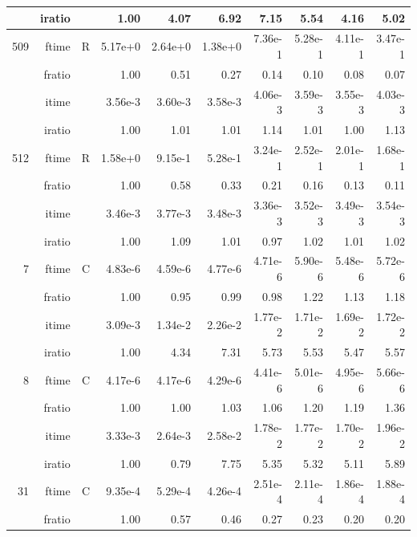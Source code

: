 \documentclass[a4paper]{article}
\begin{document}
\begin{table}[htbp]
\begin{center}
\begin{small}
\begin{tabular}{|r|r|r|r|r|r|r|r|r|r|}
     & iratio & &       1.00 &   4.07 &   6.92 &   7.15 &   5.54 &   4.16 &   5.02     \\ \hline 
  509  & ftime & R  &   5.17e+0 &   2.64e+0 &   1.38e+0 &   7.36e-1 &   5.28e-1 &   4.11e-1 &   3.47e-1   \\ 
      & fratio & &      1.00 &   0.51 &   0.27 &   0.14 &   0.10 &   0.08 &   0.07       \\ 
     & itime & &        3.56e-3 &   3.60e-3 &   3.58e-3 &   4.06e-3 &   3.59e-3 &   3.55e-3 &   4.03e-3      \\ 
     & iratio & &       1.00 &   1.01 &   1.01 &   1.14 &   1.01 &   1.00 &   1.13        \\ \hline 
  512  & ftime & R  &   1.58e+0 &   9.15e-1 &   5.28e-1 &   3.24e-1 &   2.52e-1 &   2.01e-1 &   1.68e-1    \\ 
      & fratio & &      1.00 &   0.58 &   0.33 &   0.21 &   0.16 &   0.13 &   0.11    \\ 
     & itime & &        3.46e-3 &   3.77e-3 &   3.48e-3 &   3.36e-3 &   3.52e-3 &   3.49e-3 &   3.54e-3       \\ 
     & iratio & &       1.00 &   1.09 &   1.01 &   0.97 &   1.02 &   1.01 &   1.02       \\ \hline \hline
    7  & ftime & C  &   4.83e-6 &   4.59e-6 &   4.77e-6 &   4.71e-6 &   5.90e-6 &   5.48e-6 &   5.72e-6   \\ 
      & fratio & &      1.00 &   0.95 &   0.99 &   0.98 &   1.22 &   1.13 &   1.18    \\ 
     & itime & &        3.09e-3 &   1.34e-2 &   2.26e-2 &   1.77e-2 &   1.71e-2 &   1.69e-2 &   1.72e-2     \\ 
     & iratio & &       1.00 &   4.34 &   7.31 &   5.73 &   5.53 &   5.47 &   5.57       \\ \hline 
    8  & ftime & C  &   4.17e-6 &   4.17e-6 &   4.29e-6 &   4.41e-6 &   5.01e-6 &   4.95e-6 &   5.66e-6     \\ 
      & fratio & &      1.00 &   1.00 &   1.03 &   1.06 &   1.20 &   1.19 &   1.36     \\ 
     & itime & &        3.33e-3 &   2.64e-3 &   2.58e-2 &   1.78e-2 &   1.77e-2 &   1.70e-2 &   1.96e-2      \\ 
     & iratio & &       1.00 &   0.79 &   7.75 &   5.35 &   5.32 &   5.11 &   5.89       \\ \hline 
   31  & ftime & C  &   9.35e-4 &   5.29e-4 &   4.26e-4 &   2.51e-4 &   2.11e-4 &   1.86e-4 &   1.88e-4    \\ 
      & fratio & &      1.00 &   0.57 &   0.46 &   0.27 &   0.23 &   0.20 &   0.20     \\ 

\end{tabular}
\end{small}
\end{center}
\end{table}
\end{document}
